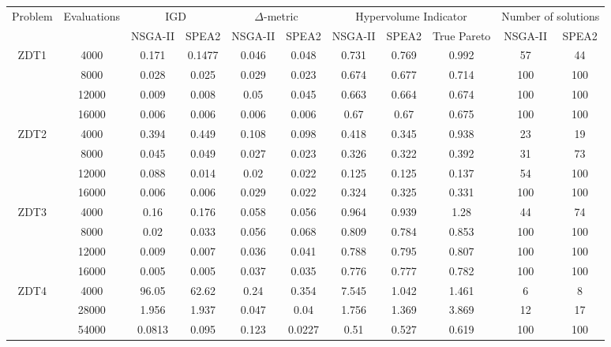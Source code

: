 \documentclass[sigconf, nonacm, preprint]{acmart}
\begin{document}
\begin{table}
    \centering
    \begin{tabular}{|c|c|c|c|c|c|c|c|c|c|c|}
    \hline
         \multirow{2}{3em}{Problem} & \multirow{2}{4.5em}{Evaluations} & \multicolumn{2}{|c|}{IGD} & \multicolumn{2}{|c|}{$\Delta$-metric} & \multicolumn{3}{|c|}{Hypervolume Indicator} & \multicolumn{2}{|c|}{Number of solutions}\\
         \cline{3-11}
         & & NSGA-II & SPEA2 & NSGA-II & SPEA2 & NSGA-II & SPEA2 & True Pareto & NSGA-II & SPEA2\\
         \hline
         \multirow{4}{3em}{ZDT1} & 4000 & 0.171 & 0.1477 & 0.046 & 0.048 & 0.731 & 0.769 & 0.992 & 57 & 44 \\
         & 8000 & 0.028 & 0.025 & 0.029 & 0.023 & 0.674 & 0.677 & 0.714 & 100 & 100\\
         & 12000 & 0.009 & 0.008 & 0.05 & 0.045 & 0.663 & 0.664 & 0.674 & 100 & 100\\
         & 16000 & 0.006 & 0.006 & 0.006 & 0.006 & 0.67 & 0.67 & 0.675 & 100 & 100\\
         \hline
         \multirow{4}{3em}{ZDT2} & 4000 & 0.394 & 0.449 & 0.108 & 0.098 & 0.418 & 0.345 & 0.938 & 23 & 19\\
         & 8000 & 0.045 & 0.049 & 0.027 & 0.023 & 0.326 & 0.322 & 0.392 & 31 & 73 \\
         & 12000 & 0.088 & 0.014 & 0.02 & 0.022 & 0.125 & 0.125 & 0.137 & 54 & 100 \\
         & 16000 & 0.006 & 0.006 & 0.029 & 0.022 & 0.324 & 0.325 & 0.331 & 100 & 100\\
         \hline
         \multirow{4}{3em}{ZDT3} & 4000 & 0.16 & 0.176 & 0.058 & 0.056 & 0.964 & 0.939 & 1.28 & 44 & 74\\
         & 8000 & 0.02 & 0.033 & 0.056 & 0.068 & 0.809 & 0.784 & 0.853 & 100 & 100\\
         & 12000 & 0.009 & 0.007 & 0.036 & 0.041 & 0.788 & 0.795 & 0.807 & 100 & 100\\
         & 16000 & 0.005 & 0.005 & 0.037 & 0.035 & 0.776 & 0.777 & 0.782 & 100 & 100\\
         \hline
         \multirow{4}{3em}{ZDT4} & 4000 & 96.05 & 62.62 & 0.24 & 0.354 & 7.545 & 1.042 & 1.461 & 6 & 8\\
         & 28000 & 1.956 & 1.937 & 0.047 & 0.04 & 1.756 & 1.369 & 3.869 & 12 & 17\\
         & 54000 & 0.0813 & 0.095 & 0.123 & 0.0227 & 0.51 & 0.527 & 0.619 & 100 & 100\\

\end{tabular}
\end{table}
\end{document}
